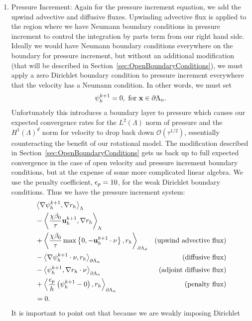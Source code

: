 \documentclass[letterpaper]{erdc}
\begin{document}
\begin{enumerate}
\item Pressure Increment: Again for the pressure increment equation, we add the
  upwind advective and diffusive fluxes.  Upwinding advective flux is applied
  to the region where we have Neumann boundary conditions in pressure increment
  to control the integration by parts term from our right hand side.  Ideally
  we would have Neumann boundary conditions everywhere on the boundary for
  pressure increment, but without an additional modification (that will be
  described in Section~\ref{sec:OpenBoundaryConditions}), we must apply a zero
  Dirichlet boundary condition to pressure increment everywhere that the
  velocity has a Neumann condition.  In other words, we must set
\begin{equation}
  \psi^{k+1}_h = 0, \mbox{ for }\textbf{x}\in\partial\Lambda_n.
\end{equation}
Unfortunately this introduces a boundary layer to pressure which causes our
expected convergence rates for the $L^2(\Lambda)$ norm of pressure and the
$H^1(\Lambda)^d$ norm for velocity to drop back down $\mathcal{O}(\tau^{1/2})$,
essentially counteracting the benefit of our rotational model.  The
modification described in Section~\ref{sec:OpenBoundaryConditions} gets us back
up to full expected convergence in the case of open velocity and pressure
increment boundary conditions, but at the expense of some more complicated
linear algebra.  We use the penalty coefficient, $\epsilon_p = 10$, for the weak
Dirichlet boundary conditions.  Thus we have the pressure increment system:
\begin{align*}
  &\left\langle  \nabla \psi^{k+1}_h,  \nabla r_h  \right\rangle_{\Lambda}&\\
  & - \left\langle  \frac{\chi\beta_0}{\tau} \textbf{u}^{k+1}_h,  \nabla r_h  \right\rangle_{\Lambda} &\\
  &+ \left\langle   \frac{\chi\beta_0}{\tau}\max\left\{0, -\textbf{u}^{k+1}_h\cdot\nu \right\} ,  r_h  \right\rangle_{\partial\Lambda_d}   &\mbox{(upwind advective flux)}\\
  &- \left\langle  \nabla \psi^{k+1}_h\cdot\nu,  r_h  \right\rangle_{\partial\Lambda_n}      &\mbox{(diffusive flux)}\\
  &- \left\langle  \psi^{k+1}_h,  \nabla r_h\cdot\nu  \right\rangle_{\partial\Lambda_n}      &\mbox{(adjoint diffusive flux)}\\
  &+ \left\langle  \frac{\epsilon_{p}}{h} \left(\psi^{k+1}_h - 0\right),  r_h  \right\rangle_{\partial\Lambda_n}        &\mbox{(penalty flux)}\\
  & = 0. &
\end{align*}
It is important to point out that because we are weakly imposing Dirichlet

\end{enumerate}
\end{document}
